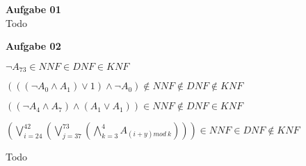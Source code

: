 \documentclass[a4paper,10pt]{article}
\begin{document}
	\parindent0pt
	\textbf{Aufgabe 01} \\
	Todo
	
	\textbf{Aufgabe 02} \\
	\begin{compactenum} [(a)]
		\item 
		\begin{compactenum} [(i)]
			\item $ \lnot A_{73} \in NNF \in DNF \in KNF $
			\item $ (((\lnot A_0 \wedge A_1)\vee 1)\wedge \lnot A_0) \not\in NNF \not\in DNF \not\in KNF$
			\item $ ((\lnot A_4 \wedge A_7)\wedge (A_1 \vee A_1)) \in NNF \not\in DNF \in KNF $
			\item $ (\bigvee\limits_{i = 24}^{42} (\bigvee\limits_{j=37}^{73} (\bigwedge\limits_{k=3}^{4} A_{(i+y) mod\ k}))) \in NNF \in DNF \not\in KNF $
		\end{compactenum}
		\item Todo
	\end{compactenum}
\end{document}
